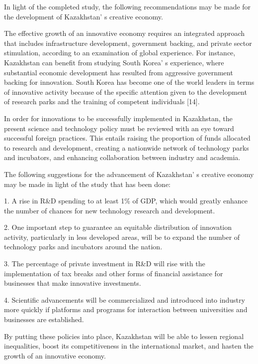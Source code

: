 \begin{multicols}{2}
In light of the completed study, the following recommendations may be
made for the development of Kazakhstan' s creative
economy.

The effective growth of an innovative economy requires an integrated
approach that includes infrastructure development, government backing,
and private sector stimulation, according to an examination of global
experience. For instance, Kazakhstan can benefit from studying South
Korea' s experience, where substantial economic
development has resulted from aggressive government backing for
innovation. South Korea has become one of the world leaders in terms of
innovative activity because of the specific attention given to the
development of research parks and the training of competent individuals
{[}14{]}.

In order for innovations to be successfully implemented in Kazakhstan,
the present science and technology policy must be reviewed with an eye
toward successful foreign practices. This entails raising the proportion
of funds allocated to research and development, creating a nationwide
network of technology parks and incubators, and enhancing collaboration
between industry and academia.

The following suggestions for the advancement of
Kazakhstan' s creative economy may be made in light of
the study that has been done:

1. A rise in R\&D spending to at least 1\% of GDP, which would greatly
enhance the number of chances for new technology research and
development.

2. One important step to guarantee an equitable distribution of
innovation activity, particularly in less developed areas, will be to
expand the number of technology parks and incubators around the
nation.

3. The percentage of private investment in R\&D will rise with the
implementation of tax breaks and other forms of financial assistance
for businesses that make innovative investments.

4. Scientific advancements will be commercialized and introduced into
industry more quickly if platforms and programs for interaction
between universities and businesses are established.

By putting these policies into place, Kazakhstan will be able to lessen
regional inequalities, boost its competitiveness in the international
market, and hasten the growth of an innovative economy.


\end{multicols}
